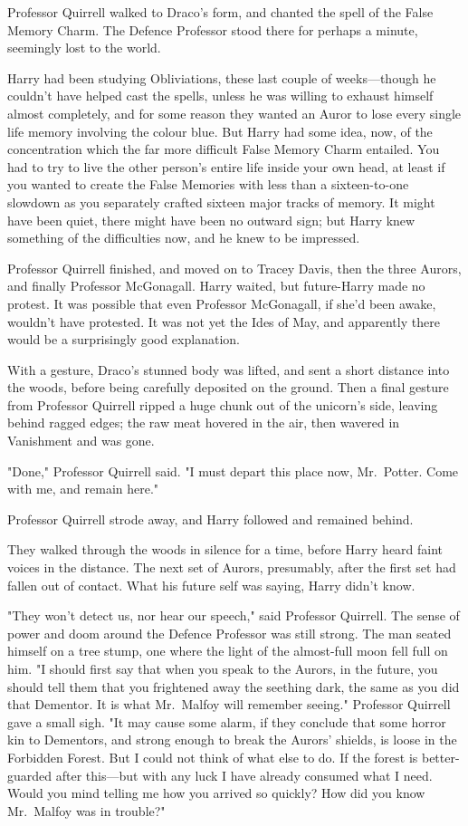 Professor Quirrell walked to Draco's form, and chanted the spell of the False
Memory Charm. The Defence Professor stood there for perhaps a minute, seemingly
lost to the world.

Harry had been studying Obliviations, these last couple of weeks---though he
couldn't have helped cast the spells, unless he was willing to exhaust himself
almost completely, and for some reason they wanted an Auror to lose every
single life memory involving the colour blue. But Harry had some idea, now, of
the concentration which the far more difficult False Memory Charm entailed. You
had to try to live the other person's entire life inside your own head, at
least if you wanted to create the False Memories with less than a
sixteen-to-one slowdown as you separately crafted sixteen major tracks of
memory. It might have been quiet, there might have been no outward sign; but
Harry knew something of the difficulties now, and he knew to be impressed.

Professor Quirrell finished, and moved on to Tracey Davis, then the three
Aurors, and finally Professor McGonagall. Harry waited, but future-Harry made
no protest. It was possible that even Professor McGonagall, if she'd been
awake, wouldn't have protested. It was not yet the Ides of May, and apparently
there would be a surprisingly good explanation.

With a gesture, Draco's stunned body was lifted, and sent a short distance into
the woods, before being carefully deposited on the ground. Then a final gesture
from Professor Quirrell ripped a huge chunk out of the unicorn's side, leaving
behind ragged edges; the raw meat hovered in the air, then wavered in
Vanishment and was gone.

"Done," Professor Quirrell said. "I must depart this place now, Mr.~Potter.
Come with me, and remain here."

Professor Quirrell strode away, and Harry followed and remained behind.

They walked through the woods in silence for a time, before Harry heard faint
voices in the distance. The next set of Aurors, presumably, after the first set
had fallen out of contact. What his future self was saying, Harry didn't know.

"They won't detect us, nor hear our speech," said Professor Quirrell. The sense
of power and doom around the Defence Professor was still strong. The man seated
himself on a tree stump, one where the light of the almost-full moon fell full
on him. "I should first say that when you speak to the Aurors, in the future,
you should tell them that you frightened away the seething dark, the same as
you did that Dementor. It is what Mr.~Malfoy will remember seeing." Professor
Quirrell gave a small sigh. "It may cause some alarm, if they conclude that
some horror kin to Dementors, and strong enough to break the Aurors' shields,
is loose in the Forbidden Forest. But I could not think of what else to do. If
the forest is better-guarded after this---but with any luck I have already
consumed what I need. Would you mind telling me how you arrived so quickly? How
did you know Mr.~Malfoy was in trouble?"

